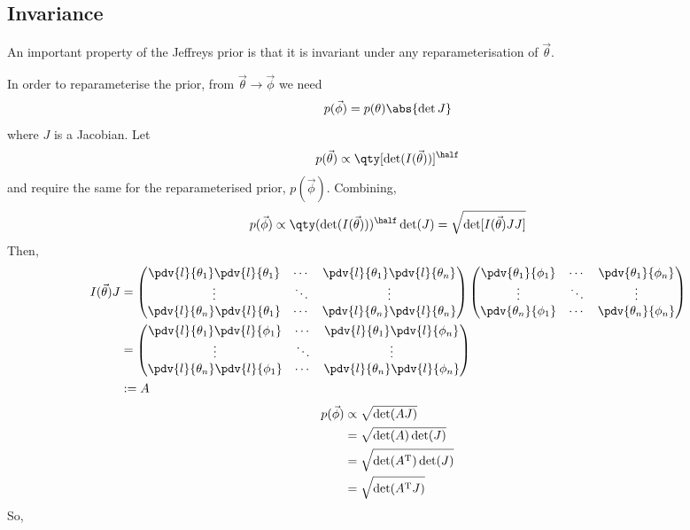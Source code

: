 \documentclass{dwnotes}         		        %
\begin{document}
\subsection{Invariance}
\label{sec:invariance}

An important property of the Jeffreys prior is that it is invariant
under any reparameterisation of $\vec{\theta}$.

In order to reparameterise the prior, from $\vec{\theta} \to \vec{\phi}$ we need
\[ p(\vec{\phi}) = p(\theta) \abs{\det{J}} \]
where $J$ is a Jacobian. Let
\[ p(\vec{\theta}) \propto \qty[ \det(I(\vec{\theta}) ) ]^{\half} \] and
require the same for the reparameterised prior, $p(\vec{\phi})$.
Combining,
\[ p(\vec{\phi}) \propto \qty( \det(I(\vec{\theta}) ) )^{\half}
\det(J) = \sqrt{\det[I(\vec{\theta})JJ]} \]
Then,
\begin{align*}
I(\vec{\theta})J &=
\begin{pmatrix}
  \pdv{l}{\theta_1} \pdv{l}{\theta_1} & \cdots & \pdv{l}{\theta_1} \pdv{l}{\theta_n} \\
  \vdots & \ddots & \vdots \\
  \pdv{l}{\theta_n} \pdv{l}{\theta_1} & \cdots & \pdv{l}{\theta_n}
  \pdv{l}{\theta_n}
\end{pmatrix}
\begin{pmatrix}
  \pdv{\theta_1}{\phi_1} & \cdots & \pdv{\theta_1}{\phi_n} \\
  \vdots & \ddots & \vdots \\
  \pdv{\theta_n}{\phi_1} & \cdots & \pdv{\theta_n}{\phi_n}
\end{pmatrix}
\\ &=
\begin{pmatrix}
  \pdv{l}{\theta_1} \pdv{l}{\phi_1} & \cdots & \pdv{l}{\theta_1} \pdv{l}{\phi_n} \\
  \vdots & \ddots & \vdots \\
  \pdv{l}{\theta_n} \pdv{l}{\phi_1} & \cdots & \pdv{l}{\theta_n}
  \pdv{l}{\phi_n} \\
\end{pmatrix}\\
&:= A
\end{align*}
\begin{align*}
  p(\vec{\phi}) &\propto \sqrt{\det(AJ)} \\ &= \sqrt{\det(A) \det(J)}
  \\ &= \sqrt{\det(A^{\rm T}) \det(J)} \\ &= \sqrt{\det(A^{\rm T}J)}
\end{align*}
So,
\end{document}
